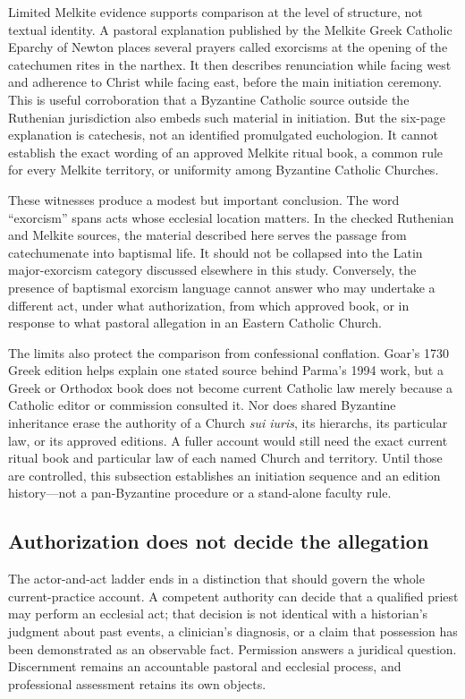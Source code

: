 Limited Melkite evidence supports comparison at the level of structure, not
textual identity. A pastoral explanation published by the Melkite Greek
Catholic Eparchy of Newton places several prayers called exorcisms at the
opening of the catechumen rites in the narthex. It then describes renunciation
while facing west and adherence to Christ while facing east, before the main
initiation ceremony. This is useful corroboration that a Byzantine Catholic
source outside the Ruthenian jurisdiction also embeds such material in
initiation. But the six-page explanation is catechesis, not an identified
promulgated euchologion. It cannot establish the exact wording of an approved
Melkite ritual book, a common rule for every Melkite territory, or uniformity
among Byzantine Catholic Churches.

These witnesses produce a modest but important conclusion. The word
``exorcism'' spans acts whose ecclesial location matters. In the checked
Ruthenian and Melkite sources, the material described here serves the passage
from catechumenate into baptismal life. It should not be collapsed into the
Latin major-exorcism category discussed elsewhere in this study. Conversely,
the presence of baptismal exorcism language cannot answer who may undertake a
different act, under what authorization, from which approved book, or in
response to what pastoral allegation in an Eastern Catholic Church.

The limits also protect the comparison from confessional conflation. Goar's
1730 Greek edition helps explain one stated source behind Parma's 1994 work,
but a Greek or Orthodox book does not become current Catholic law merely
because a Catholic editor or commission consulted it. Nor does shared
Byzantine inheritance erase the authority of a Church \emph{sui iuris}, its
hierarchs, its particular law, or its approved editions. A fuller account
would still need the exact current ritual book and particular law of each
named Church and territory. Until those are controlled, this subsection
establishes an initiation sequence and an edition history---not a
pan-Byzantine procedure or a stand-alone faculty rule.

\subsection{Authorization does not decide the allegation}

The actor-and-act ladder ends in a distinction that should govern the whole
current-practice account. A competent authority can decide that a qualified
priest may perform an ecclesial act; that decision is not identical with a
historian's judgment about past events, a clinician's diagnosis, or a claim
that possession has been demonstrated as an observable fact. Permission
answers a juridical question. Discernment remains an accountable pastoral and
ecclesial process, and professional assessment retains its own objects.

